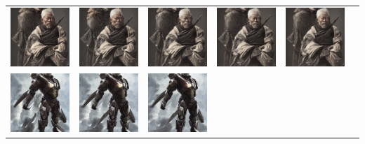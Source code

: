 \begin{table}[!htb]
\begin{tabular}{c c@{}c@{}c@{}c@{}c}
    \includegraphics[width=0.155\linewidth]{chapter/appendix/def_imgs/japman/j_10.png} &
    \includegraphics[width=0.155\linewidth]{chapter/appendix/def_imgs/japman/j_20.png} &
    \includegraphics[width=0.155\linewidth]{chapter/appendix/def_imgs/japman/j_30.png} &
    \includegraphics[width=0.155\linewidth]{chapter/appendix/def_imgs/japman/j_40.png} &
    \includegraphics[width=0.155\linewidth]{chapter/appendix/def_imgs/japman/j_50.png} \\
    \includegraphics[width=0.155\linewidth]{chapter/appendix/def_imgs/ironman/im_0.png} & 
    \includegraphics[width=0.155\linewidth]{chapter/appendix/def_imgs/ironman/im_10.png} &
    \includegraphics[width=0.155\linewidth]{chapter/appendix/def_imgs/ironman/im_20.png} &

\end{tabular}
\end{table}
